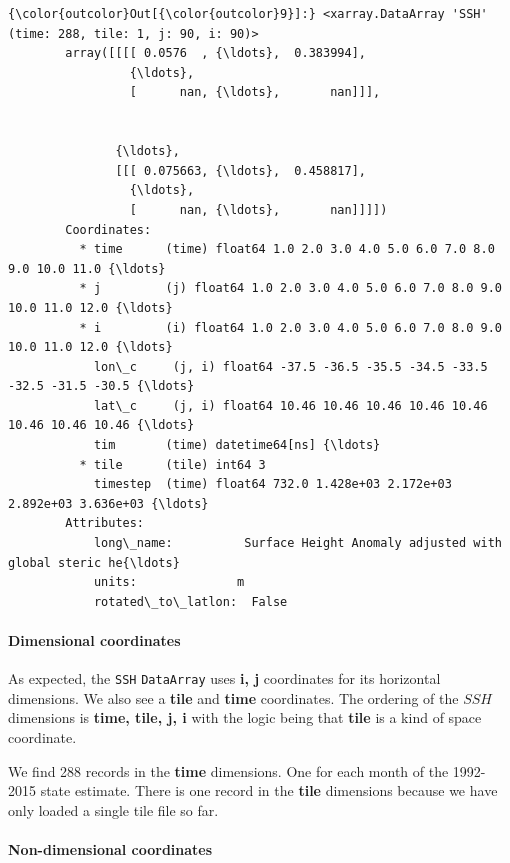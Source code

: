 \documentclass[11pt]{article}
\begin{document}
\begin{Verbatim}[commandchars=\\\{\}]
{\color{outcolor}Out[{\color{outcolor}9}]:} <xarray.DataArray 'SSH' (time: 288, tile: 1, j: 90, i: 90)>
        array([[[[ 0.0576  , {\ldots},  0.383994],
                 {\ldots}, 
                 [      nan, {\ldots},       nan]]],
        
        
               {\ldots}, 
               [[[ 0.075663, {\ldots},  0.458817],
                 {\ldots}, 
                 [      nan, {\ldots},       nan]]]])
        Coordinates:
          * time      (time) float64 1.0 2.0 3.0 4.0 5.0 6.0 7.0 8.0 9.0 10.0 11.0 {\ldots}
          * j         (j) float64 1.0 2.0 3.0 4.0 5.0 6.0 7.0 8.0 9.0 10.0 11.0 12.0 {\ldots}
          * i         (i) float64 1.0 2.0 3.0 4.0 5.0 6.0 7.0 8.0 9.0 10.0 11.0 12.0 {\ldots}
            lon\_c     (j, i) float64 -37.5 -36.5 -35.5 -34.5 -33.5 -32.5 -31.5 -30.5 {\ldots}
            lat\_c     (j, i) float64 10.46 10.46 10.46 10.46 10.46 10.46 10.46 10.46 {\ldots}
            tim       (time) datetime64[ns] {\ldots}
          * tile      (tile) int64 3
            timestep  (time) float64 732.0 1.428e+03 2.172e+03 2.892e+03 3.636e+03 {\ldots}
        Attributes:
            long\_name:          Surface Height Anomaly adjusted with global steric he{\ldots}
            units:              m
            rotated\_to\_latlon:  False
\end{Verbatim}
            
    \paragraph{Dimensional coordinates}\label{dimensional-coordinates}

As expected, the \texttt{SSH} \texttt{DataArray} uses \textbf{i, j}
coordinates for its horizontal dimensions. We also see a \textbf{tile}
and \textbf{time} coordinates. The ordering of the \(SSH\) dimensions is
\textbf{time, tile, j, i} with the logic being that \textbf{tile} is a
kind of space coordinate.

We find 288 records in the \textbf{time} dimensions. One for each month
of the 1992-2015 state estimate. There is one record in the
\textbf{tile} dimensions because we have only loaded a single tile file
so far.

\paragraph{Non-dimensional
coordinates}\label{non-dimensional-coordinates}
\end{document}

